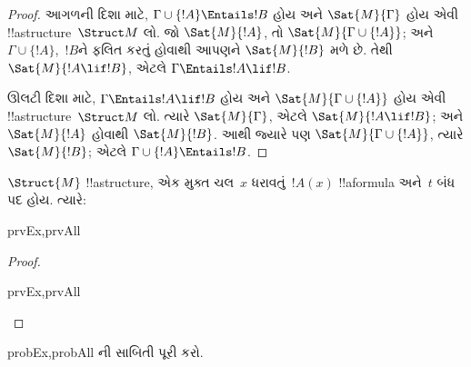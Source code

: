 \documentclass[../../../include/open-logic-section]{subfiles}
\begin{document}
\begin{proof}
આગળની દિશા માટે, $\Gamma\cup\{!A\}\Entails !B$ હોય અને
$\Sat{M}{\Gamma}$ હોય એવી !!a{structure}~$\Struct M$ લો. જો
$\Sat{M}{!A}$, તો $\Sat{M}{\Gamma\cup\{!A\}}$; અને
$\Gamma\cup\{!A\}$,~$!B$ને ફલિત કરતું હોવાથી આપણને
$\Sat{M}{!B}$ મળે છે. તેથી $\Sat{M}{!A\lif !B}$, એટલે
$\Gamma\Entails !A\lif !B$.

ઊલટી દિશા માટે, $\Gamma\Entails !A\lif !B$ હોય અને
$\Sat{M}{\Gamma\cup\{!A\}}$ હોય એવી !!a{structure}~$\Struct M$ લો.
ત્યારે $\Sat{M}{\Gamma}$, એટલે $\Sat{M}{!A\lif !B}$; અને
$\Sat{M}{!A}$ હોવાથી $\Sat{M}{!B}$. આથી જ્યારે પણ
$\Sat{M}{\Gamma\cup\{!A\}}$, ત્યારે $\Sat{M}{!B}$; એટલે
$\Gamma\cup\{!A\}\Entails !B$.
\end{proof}

\begin{prop}
  $\Struct{M}$ !!a{structure}, એક મુક્ત ચલ~$x$ ધરાવતું~$!A(x)$
  !!a{formula} અને~$t$ બંધ પદ હોય. ત્યારે:
  \begin{tagenumerate}{prvEx,prvAll}
  \end{tagenumerate}
\end{prop}

\begin{proof}
  \begin{tagenumerate}{prvEx,prvAll}
  \end{tagenumerate}
\end{proof}

\begin{probtag}{probEx,probAll}
  ની સાબિતી પૂરી કરો.
\end{probtag}
\end{document}
